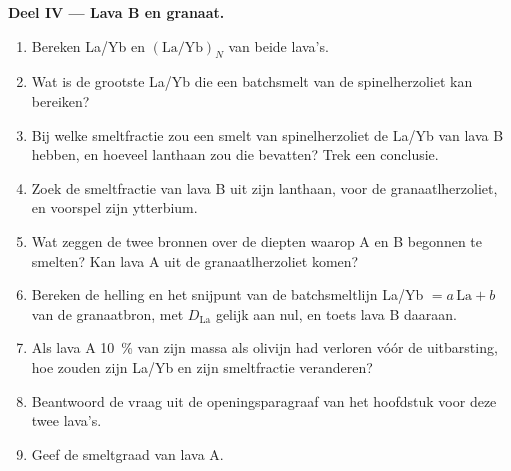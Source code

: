 \begin{problem}
\medskip\noindent\textbf{Deel IV --- Lava B en granaat.}
\begin{enumerate}[resume]
\item Bereken La/Yb en $(\mathrm{La}/\mathrm{Yb})_N$ van beide lava's.
\item Wat is de grootste La/Yb die een batchsmelt van de spinelherzoliet
kan bereiken?
\item Bij welke smeltfractie zou een smelt van spinelherzoliet de La/Yb van
lava B hebben, en hoeveel lanthaan zou die bevatten? Trek een conclusie.
\item Zoek de smeltfractie van lava B uit zijn lanthaan, voor de granaatlherzoliet,
en voorspel zijn ytterbium.
\item Wat zeggen de twee bronnen over de diepten waarop A en B begonnen te
smelten? Kan lava A uit de granaatlherzoliet komen?
\item Bereken de helling en het snijpunt van de batchsmeltlijn La/Yb $= a\,
\mathrm{La} + b$ van de granaatbron, met $D_{\mathrm{La}}$ gelijk aan nul,
en toets lava B daaraan.
\item Als lava A \qty{10}{\percent} van zijn massa als olivijn had verloren
vóór de uitbarsting, hoe zouden zijn La/Yb en zijn smeltfractie veranderen?
\item Beantwoord de vraag uit de openingsparagraaf van het hoofdstuk voor deze twee lava's.
\item Geef de smeltgraad van lava A.
\end{enumerate}
\end{problem}
